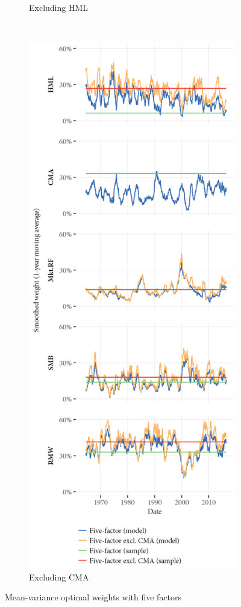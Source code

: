 \begin{figure}[htbp]
\begin{subfigure}{0.45\textwidth}
    \caption{Excluding HML}
  \end{subfigure}
  ~
  \begin{subfigure}{0.45\textwidth}
    \includegraphics[width=\textwidth]{graphics/weights/main_Weights_MV_5F_EXCL_CMA_5F.png}
    \caption{Excluding CMA}
  \end{subfigure}  
  \caption{Mean-variance optimal weights with five factors}


\end{figure}
